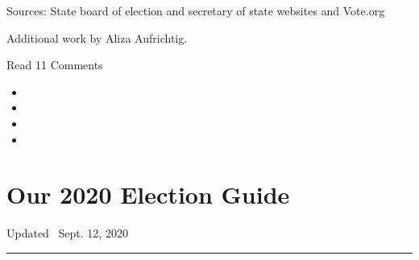 Sources: State board of election and secretary of state websites and
Vote.org

Additional work by Aliza Aufrichtig.

Read 11 Comments

\begin{itemize}
\item
\item
\item
\item
\end{itemize}

\hypertarget{our-2020-election-guide}{%
\section{Our 2020 Election Guide}\label{our-2020-election-guide}}

Updated ~Sept. 12, 2020

\begin{center}\rule{0.5\linewidth}{\linethickness}\end{center}

